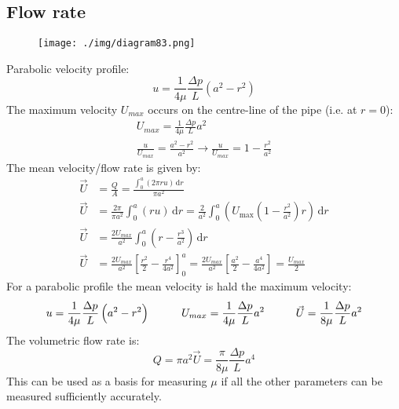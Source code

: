 \subsection{Flow rate}
\begin{figure}[H]
  \centering
  \texttt{[image: ./img/diagram83.png]}
  \caption{}
\end{figure}
Parabolic velocity profile:
\begin{equation}
  u = \frac{1}{4\mu} \frac{\Delta p}{L} \left( a^2 - r^2\right)
\end{equation}
The maximum velocity $U_{max}$ occurs on the centre-line of the pipe (i.e. at $r=0$):
\begin{gather}
  U_{max} = \frac{1}{4\mu} \frac{\Delta p}{L}a^2\\
  \frac{u}{U_{max}} = \frac{a^2 - r^2}{a^2} \rightarrow \frac{u}{U_{max}} = 1 - \frac{r^2}{a^2}
\end{gather}
The mean velocity/flow rate is given by:
\begin{align}
  \vec{U} & = \frac{Q}{A} = \frac{\int_{0}^{a} \left(2\pi r u \right) \,\textrm{d}r}{\pi a^2}                                                                                      \\
  \vec{U} & = \frac{2\pi}{\pi a^2} \int_{0}^{a} \left(r u \right) \,\textrm{d}r = \frac{2}{a^2} \int_{0}^{a} \left(U_{\max} \left(1 - \frac{r^2}{a^2}\right)r\right) \,\textrm{d}r \\
  \vec{U} & = \frac{2U_{max}}{a^2} \int_{0}^{a} \left(r-\frac{r^3}{a^2}\right) \,\textrm{d}r                                                                                       \\
  \vec{U} & = \frac{2U_{max}}{a^2} \left[ \frac{r^2}{2} - \frac{r^4}{4a^2} \right]_0^a = \frac{2U_{max}}{a^2} \left[ \frac{a^2}{2} - \frac{a^4}{4a^2} \right] = \frac{U_{max}}{2}
\end{align}
For a parabolic profile the mean velocity is hald the maximum velocity:
\begin{equation}
  u = \frac{1}{4\mu} \frac{\Delta p}{L} \left(a^2 - r^2\right) \makebox[1cm]{} U_{max} = \frac{1}{4\mu} \frac{\Delta p }{L} a^2 \makebox[1cm]{} \vec{U} = \frac{1}{8\mu}\frac{\Delta p}{L} a^2
\end{equation}
The volumetric flow rate is:
\begin{equation}
  Q = \pi a^2 \vec{U} = \frac{\pi}{8\mu}\frac{\Delta p}{L} a^4
\end{equation}
This can be used as a basis for measuring $\mu$ if all the other parameters can be measured sufficiently accurately.
